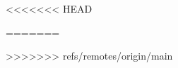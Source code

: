 \documentclass{article}
\begin{document}
<<<<<<< HEAD


=======

\newpage

>>>>>>> refs/remotes/origin/main
\end{document}
